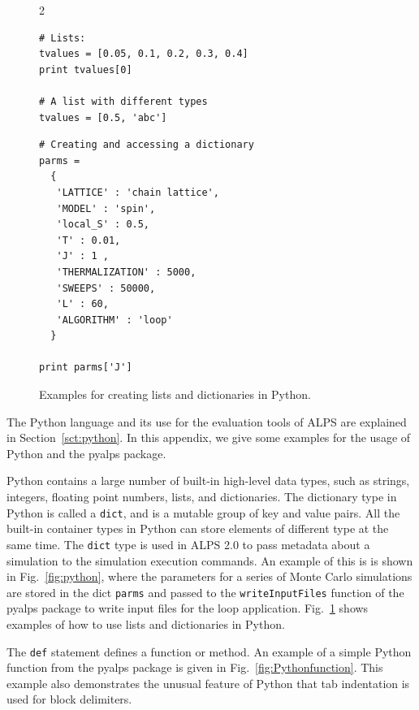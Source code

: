 \documentclass[12pt]{iopart}
\begin{document}
\begin{figure}
\begin{multicols}{2}
\begin{lstlisting}
# Lists:
tvalues = [0.05, 0.1, 0.2, 0.3, 0.4]
print tvalues[0]

# A list with different types
tvalues = [0.5, 'abc']
\end{lstlisting}
\columnbreak
\begin{lstlisting}
# Creating and accessing a dictionary
parms =
  { 
   'LATTICE' : 'chain lattice',
   'MODEL' : 'spin',
   'local_S' : 0.5,
   'T' : 0.01,
   'J' : 1 ,
   'THERMALIZATION' : 5000,
   'SWEEPS' : 50000,
   'L' : 60,
   'ALGORITHM' : 'loop'
  }

print parms['J']

\end{lstlisting}
\end{multicols}
\caption{Examples for creating lists and dictionaries in Python.}
\label{fig:listdict}
\end{figure}

The Python language and its use for the evaluation tools of ALPS are explained in Section~\ref{sct:python}. In this appendix, we give some examples for the usage of Python and the pyalps package.

Python contains a large number of built-in high-level data types, such as strings, integers, floating point numbers, lists, and dictionaries. The dictionary type in Python is called a {\tt dict}, and is a mutable group of key and value pairs. All the built-in container types in Python can store elements of different type at the same time. The {\tt dict} type is used in ALPS 2.0 to pass metadata about a simulation to the simulation execution commands. An example of this is is shown in Fig.~\ref{fig:python}, where the parameters for a series of Monte Carlo simulations are stored in the dict {\tt parms} and passed to the {\tt writeInputFiles} function of the pyalps package to write input files for the loop application. Fig.~\ref{fig:listdict} shows examples of how to use lists and dictionaries in Python.

The {\tt def} statement defines a function or method. An example of a simple Python function from the pyalps package is given in Fig.~\ref{fig:Pythonfunction}. This example also demonstrates the unusual feature of Python that tab indentation is used for block delimiters.
\end{document}
